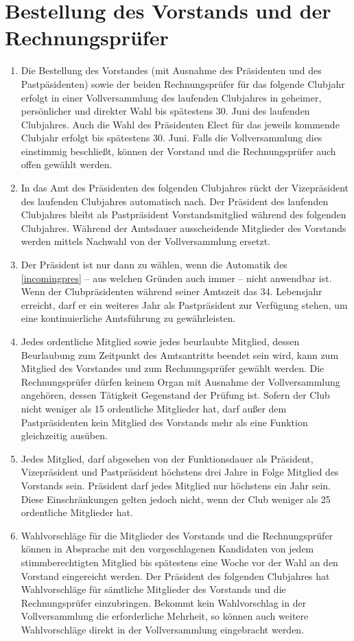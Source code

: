 \documentclass{statutclass}
\begin{document}
\section{Bestellung des Vorstands und der Rechnungsprüfer}
\begin{enumerate}[ref=Absatz \arabic*]
    \item Die Bestellung des Vorstandes (mit Ausnahme des Präsidenten und des Pastpäsidenten) sowie der beiden Rechnungsprüfer für das folgende Clubjahr erfolgt in einer Vollversammlung des laufenden Clubjahres in geheimer, persönlicher und direkter Wahl bis spätestens 30. Juni des laufenden Clubjahres. Auch die Wahl des Präsidenten Elect für das jeweils kommende Clubjahr erfolgt bis spätestens 30. Juni. Falls die Vollversammlung dies einstimmig beschließt, können der Vorstand und die Rechnungsprüfer auch offen gewählt werden.
    \item\label{incomingpres} In das Amt des Präsidenten des folgenden Clubjahres rückt der Vizepräsident des laufenden Clubjahres automatisch nach. Der Präsident des laufenden Clubjahres bleibt als Pastpräsident Vorstandsmitglied während des folgenden Clubjahres. Während der Amtsdauer ausscheidende Mitglieder des Vorstands werden mittels Nachwahl von der Vollversammlung ersetzt.
    \item Der Präsident ist nur dann zu wählen, wenn die Automatik des \ref{incomingpres} -- aus welchen Gründen auch immer -- nicht anwendbar ist. Wenn der Clubpräsidenten während seiner Amtszeit das 34. Lebensjahr erreicht, darf er ein weiteres Jahr als Pastpräsident zur Verfügung stehen, um eine kontinuierliche Amtsführung zu gewährleisten.
    \item Jedes ordentliche Mitglied sowie jedes beurlaubte Mitglied, dessen Beurlaubung zum Zeitpunkt des Amtsantritts beendet sein wird, kann zum Mitglied des Vorstandes und zum Rechnungsprüfer gewählt werden. Die Rechnungsprüfer dürfen keinem Organ mit Ausnahme der Vollversammlung angehören, dessen Tätigkeit Gegenstand der Prüfung ist. Sofern der Club nicht weniger als 15 ordentliche Mitglieder hat, darf außer dem Pastpräsidenten kein Mitglied des Vorstands mehr als eine Funktion gleichzeitig ausüben.
    \item Jedes Mitglied, darf abgesehen von der Funktionsdauer als Präsident, Vizepräsident und Pastpräsident höchstens drei Jahre in Folge Mitglied des Vorstands sein. Präsident darf jedes Mitglied nur höchstens ein Jahr sein. Diese Einschränkungen gelten jedoch nicht, wenn der Club weniger als 25 ordentliche Mitglieder hat.
    \item Wahlvorschläge für die Mitglieder des Vorstands und die Rechnungsprüfer können in Absprache mit den vorgeschlagenen Kandidaten von jedem stimmberechtigten Mitglied bis spätestens eine Woche vor der Wahl an den Vorstand eingereicht werden. Der Präsident des folgenden Clubjahres hat Wahlvorschläge für sämtliche Mitglieder des Vorstands und die Rechnungsprüfer einzubringen. Bekommt kein Wahlvorschlag in der Vollversammlung die erforderliche Mehrheit, so können auch weitere Wahlvorschläge direkt in der Vollversammlung eingebracht werden.

\end{enumerate}
\end{document}

